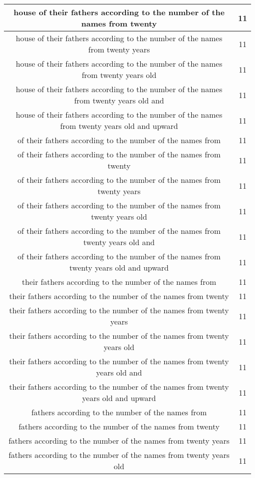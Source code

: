 \begin{center}
\begin{longtable}{|c|c|}
house of their fathers according to the number of the names from twenty & 11\\ \hline 
house of their fathers according to the number of the names from twenty years & 11\\ \hline 
house of their fathers according to the number of the names from twenty years old & 11\\ \hline 
house of their fathers according to the number of the names from twenty years old and & 11\\ \hline 
house of their fathers according to the number of the names from twenty years old and upward & 11\\ \hline 
of their fathers according to the number of the names from & 11\\ \hline 
of their fathers according to the number of the names from twenty & 11\\ \hline 
of their fathers according to the number of the names from twenty years & 11\\ \hline 
of their fathers according to the number of the names from twenty years old & 11\\ \hline 
of their fathers according to the number of the names from twenty years old and & 11\\ \hline 
of their fathers according to the number of the names from twenty years old and upward & 11\\ \hline 
their fathers according to the number of the names from & 11\\ \hline 
their fathers according to the number of the names from twenty & 11\\ \hline 
their fathers according to the number of the names from twenty years & 11\\ \hline 
their fathers according to the number of the names from twenty years old & 11\\ \hline 
their fathers according to the number of the names from twenty years old and & 11\\ \hline 
their fathers according to the number of the names from twenty years old and upward & 11\\ \hline 
fathers according to the number of the names from & 11\\ \hline 
fathers according to the number of the names from twenty & 11\\ \hline 
fathers according to the number of the names from twenty years & 11\\ \hline 
fathers according to the number of the names from twenty years old & 11\\ \hline 

\end{longtable}
\end{center}
